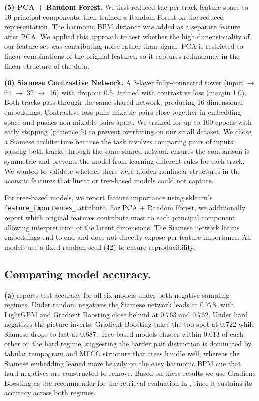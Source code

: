 \documentclass{article}
\begin{document}
\noindent\textbf{(5) PCA + Random Forest.} We first reduced the per-track feature space to 10 principal components, then trained a Random Forest on the reduced representation. The harmonic BPM distance was added as a separate feature after PCA. We applied this approach to test whether the high dimensionality of our feature set was contributing noise rather than signal. PCA is restricted to linear combinations of the original features, so it captures redundancy in the linear structure of the data.

\noindent\textbf{(6) Siamese Contrastive Network.} A 3-layer fully-connected tower (input $\to$ 64 $\to$ 32 $\to$ 16) with dropout 0.5, trained with contrastive loss (margin 1.0). Both tracks pass through the same shared network, producing 16-dimensional embeddings. Contrastive loss pulls mixable pairs close together in embedding space and pushes non-mixable pairs apart. We trained for up to 100 epochs with early stopping (patience 5) to prevent overfitting on our small dataset. We chose a Siamese architecture because the task involves comparing pairs of inputs: passing both tracks through the same shared network ensures the comparison is symmetric and prevents the model from learning different rules for each track. We wanted to validate whether there were hidden nonlinear structures in the acoustic features that linear or tree-based models could not capture.

For tree-based models, we report feature importance using sklearn's \texttt{feature\_importances\_} attribute. For PCA + Random Forest, we additionally report which original features contribute most to each principal component, allowing interpretation of the latent dimensions. The Siamese network learns embeddings end-to-end and does not directly expose per-feature importance. All models use a fixed random seed (42) to ensure reproducibility.

\subsection{Comparing model accuracy.}  \textbf{(a)} reports test accuracy for all six models under both negative-sampling regimes. Under random negatives the Siamese network leads at $0.778$, with LightGBM and Gradient Boosting close behind at $0.763$ and $0.762$. Under hard negatives the picture inverts: Gradient Boosting takes the top spot at $0.722$ while Siamese drops to last at $0.687$. Tree-based models cluster within $0.013$ of each other on the hard regime, suggesting the harder pair distinction is dominated by tabular tempogram and MFCC structure that trees handle well, whereas the Siamese embedding leaned more heavily on the easy harmonic BPM cue that hard negatives are constructed to remove. Based on these results we use Gradient Boosting as the recommender for the retrieval evaluation in , since it sustains its accuracy across both regimes.
\end{document}
